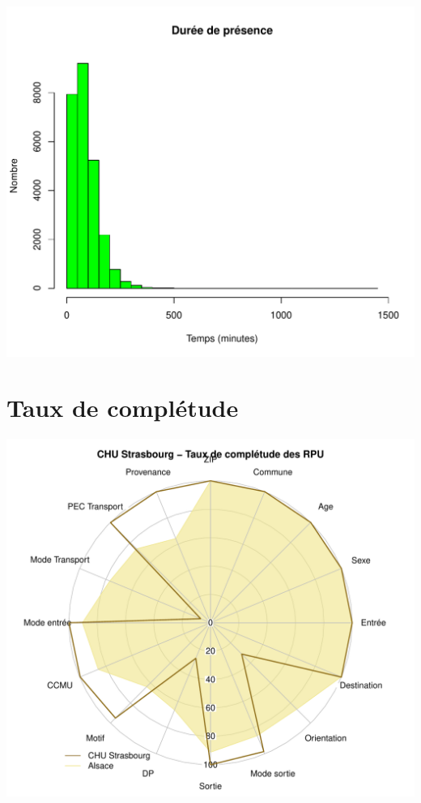 \documentclass[12pt,english,french,twoside]{book}\usepackage[]{graphicx}\usepackage[]{color}
\makeatletter
\def\maxwidth{ %
  \ifdim\Gin@nat@width>\linewidth
    \linewidth
  \else
    \Gin@nat@width
  \fi
}
\newenvironment{knitrout}{}{} %
\makeatother
\begin{document}
\begin{knitrout}
\color{fgcolor}
\includegraphics[width=\maxwidth]{figure/graphe_hus} 

\end{knitrout}


\section*{Taux de complétude}

\begin{knitrout}
\color{fgcolor}
\includegraphics[width=\maxwidth]{figure/compl_hus} 

\end{knitrout}
\end{document}
